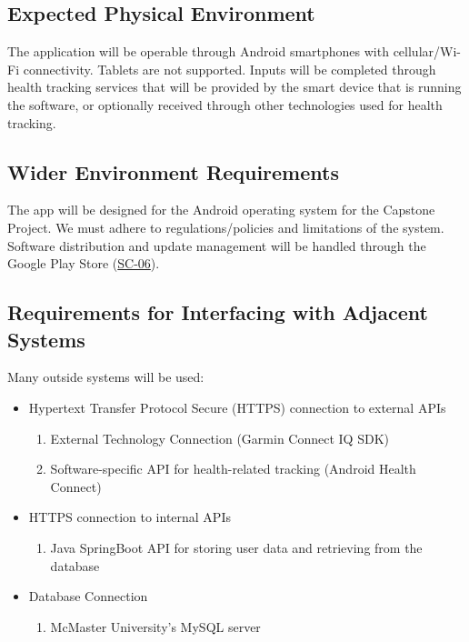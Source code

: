 \documentclass[12pt]{article}
\newcommand{\acr}[3]{\phantomsection\label{acr:#1}#2 (#3)}
\begin{document}
\subsection{Expected Physical Environment}
The application will be operable through Android smartphones with cellular/Wi-Fi connectivity. Tablets are not supported. Inputs will be completed through health tracking services that will be provided by the smart device that is running the software, or optionally received through other technologies used for health tracking.
\subsection{Wider Environment Requirements}
The app will be designed for the Android operating system for the Capstone Project. We must adhere to regulations/policies and limitations of the system. Software distribution and update management will be handled through the Google Play Store (\hyperlink{req:SC-06}{SC-06}). 
\subsection{Requirements for Interfacing with Adjacent Systems}
Many outside systems will be used:
\begin{itemize}
    \item \acr{HTTPS}{Hypertext Transfer Protocol Secure}{HTTPS} connection to external APIs
    \begin{enumerate}
        \item External Technology Connection (Garmin Connect IQ SDK)
        \item Software-specific API for health-related tracking (Android Health Connect)
    \end{enumerate}
    \item HTTPS connection to internal APIs
    \begin{enumerate}
        \item Java SpringBoot API for storing user data and retrieving from the database
    \end{enumerate}
    \item Database Connection
    \begin{enumerate}
        \item McMaster University's MySQL server
    \end{enumerate}
\end{itemize}
\end{document}
